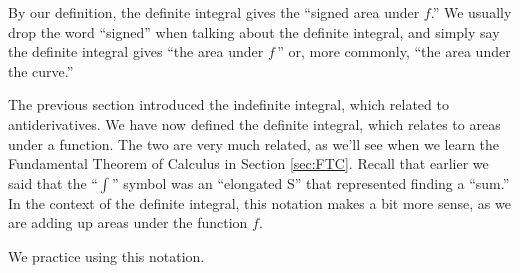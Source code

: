 By our definition, the definite integral gives the ``signed area under $f$.'' We usually drop the word ``signed'' when talking about the definite integral, and simply say the definite integral gives ``the area under $f$\,'' or, more commonly, ``the area under the curve.''

The previous section introduced the indefinite integral, which related to antiderivatives. We have now defined the definite integral, which relates to areas under a function. The two are very much related, as we'll see when we learn the Fundamental Theorem of Calculus in Section \ref{sec:FTC}. Recall that earlier we said that the ``$\int$'' symbol was an ``elongated S'' that represented finding a ``sum.'' In the context of the definite integral, this notation makes a bit more sense, as we are adding up areas under the function $f$.

We practice using this notation.\\

